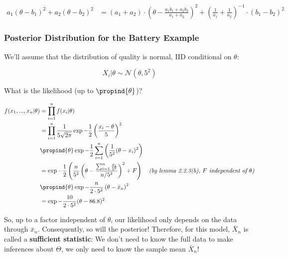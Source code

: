 \documentclass[a4paper]{article}
\begin{document}
                    \begin{align*}
                        a_1(\theta - b_1)^2 + a_2(\theta - b_2)^2 & =
                            (a_1 + a_2) \cdot \left(\theta - \frac{a_1b_1 +
                            a_2b_2}{a_1 + a_2}\right)^2 + \left(\frac{1}{a_1} +
                            \frac{1}{a_2}\right)^{-1} \cdot (b_1 - b_2)^2
                    \end{align*}

            \subsubsection{Posterior Distribution for the Battery Example}
                We'll assume that the distribution of quality is normal, IID
                conditional on $\theta$:

                \[
                    X_i | \theta \sim \mathcal{N}(\theta, 5^2)
                \]

                What is the likelihood (up to $\propind{\theta}$)?

                \begin{align*}
                    f(x_1, ..., x_n | \theta) & = \prod_{i=1}^n f(x_i | \theta)
                        \\
                    & = \prod_{i = 1}^n \frac{1}{5\sqrt{2\pi}} \exp{-\frac{1}{2}
                        \left(\frac{x_i - \theta}{5}\right)^2} \\
                    & \propind{\theta} \exp-\frac{1}{2}\sum_{i=1}^n \left(
                        \frac{1}{5^2} (\theta - x_i)^2\right) \\
                    & = \exp{-\frac{1}{2}\left(\frac{n}{5^2} \left(\theta -
                        \frac{\sum_{i=1}^n \frac{x_i}{5^2}}{n/5^2}\right)^2 + F
                        \right)}& \textit{(by lemma 2.2.3(b), $F$ independent of
                        $\theta$)} \\
                    & \propind{\theta} \exp{-\frac{n}{2 \cdot 5^2}\left(\theta -
                        \bar x_n\right)^2} \\
                    & = \exp{-\frac{10}{2 \cdot 5^2}(\theta - 86.8)^2}
                \end{align*}

                So, up to a factor independent of $\theta$, our likelihood only
                depends on the data through $\bar x_n$. Consequently, so will
                the posterior! Therefore, for this model, $\bar X_n$ is called
                a \textbf{sufficient statistic}: We don't need to know the full
                data to make inferences about $\Theta$, we only need to know the
                sample mean $\bar X_n$!
\end{document}
